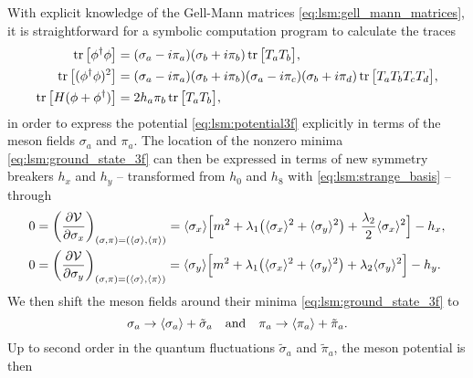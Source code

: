 With explicit knowledge of the Gell-Mann matrices \eqref{eq:lsm:gell_mann_matrices},
it is straightforward for a symbolic computation program to calculate the traces
\begin{subequations}
\begin{align}
	\operatorname{tr}\big[\phi^\dagger \phi\big]     &= (\sigma_a - i \pi_a) (\sigma_b + i \pi_b) \operatorname{tr} \big[ T_a T_b \big], \\
	\operatorname{tr}\big[(\phi^\dagger \phi)^2\big] &= (\sigma_a - i \pi_a) (\sigma_b + i \pi_b) (\sigma_a - i \pi_c) (\sigma_b + i \pi_d) \operatorname{tr} \big[ T_a T_b T_c T_d \big], \\
	\operatorname{tr}\big[H(\phi+\phi^\dagger)\big]  &= 2 h_a \pi_b \operatorname{tr} \big[ T_a T_b \big] ,
\end{align}
\end{subequations}
in order to express the potential \eqref{eq:lsm:potential3f} explicitly in terms of the meson fields $\sigma_a$ and $\pi_a$.
The location of the nonzero minima \eqref{eq:lsm:ground_state_3f} can then be expressed in terms of new symmetry breakers $h_x$ and $h_y$ -- transformed from $h_0$ and $h_8$ with \eqref{eq:lsm:strange_basis} -- through
\begin{subequations}
\begin{align}
	0 &= \pdv{\mathcal{V}}{\sigma_x}_{(\sigma,\pi)=(\langle \sigma \rangle,\langle \pi \rangle)} = \langle \sigma_x \rangle \Big[ m^2 + \lambda_1 \big( \langle \sigma_x \rangle^2 + \langle \sigma_y \rangle^2 \big) + \frac{\lambda_2}{2} \langle \sigma_x \rangle^2 \Big] - h_x, \\
	0 &= \pdv{\mathcal{V}}{\sigma_y}_{(\sigma,\pi)=(\langle \sigma \rangle,\langle \pi \rangle)} = \langle \sigma_y \rangle \Big[ m^2 + \lambda_1 \big( \langle \sigma_x \rangle^2 + \langle \sigma_y \rangle^2 \big) + \lambda_2 \langle \sigma_y \rangle^2 \Big] - h_y.
\end{align}
\label{eq:lsm3f:symmetry_breakers}%
\end{subequations}
We then shift the meson fields around their minima \eqref{eq:lsm:ground_state_3f} to
\begin{equation}
	\sigma_a \rightarrow \langle \sigma_a \rangle + \tilde{\sigma}_a
	\quad \text{and} \quad
	\pi_a \rightarrow \langle \pi_a \rangle + \tilde{\pi}_a.
\end{equation}
Up to second order in the quantum fluctuations $\tilde{\sigma}_a$ and $\tilde{\pi}_a$, the meson potential is then
